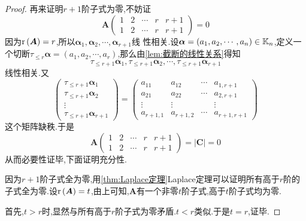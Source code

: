 {\begin{proof}
        再来证明$r+1$阶子式为零,不妨证
        \[
            \bm{A}\begin{pmatrix}
                1 & 2 & \cdots & r & r+1 \\
                1 & 2 & \cdots & r & r+1
            \end{pmatrix}=0
        \]
        因为$\mathrm{r} \left(\bm{A}\right)=r$,所以$\bm{\alpha}_1,\bm{\alpha}_{2},\cdots,\bm{\alpha}_{r+1}$线
        性相关.设$\bm{\alpha}=\left(a_1,a_2,\cdots,a_n\right)\in \mathbb{K} _n$,定义一个切断$\tau _{\leqslant r}\bm{\alpha}=\left(a_1,a_2,\cdots,
            a_r\right)$,那么由\cref{lem:截断的线性关系}得知
        \[
            \tau_{\leqslant r+1}\bm{\alpha}_1,\tau_{\leqslant r+1}\bm{\alpha}_2,
            \cdots,\tau_{\leqslant r+1}\bm{\alpha}_{r+1}
        \]
        线性相关.又
        \[
            \begin{pmatrix}
                \tau_{\leqslant r+1}\bm{\alpha}_1 \\
                \tau_{\leqslant r+1}\bm{\alpha}_2 \\
                \vdots                            \\
                \tau_{\leqslant r+1}\bm{\alpha}_{r+1}
            \end{pmatrix}=
            \begin{pmatrix}
                a_{11}    & a_{12}    & \cdots & a_{1,r+1}   \\
                a_{21}    & a_{22}    & \cdots & a_{2,r+1}   \\
                \vdots    & \vdots    &        & \vdots      \\
                a_{r+1,1} & a_{r+1,2} & \cdots & a_{r+1,r+1}
            \end{pmatrix}
        \]
        这个矩阵缺秩.于是
        \[
            \bm{A}\begin{pmatrix}
                1 & 2 & \cdots & r & r+1 \\
                1 & 2 & \cdots & r & r+1
            \end{pmatrix}=\left|\bm{C}\right|=0
        \]
        从而必要性证毕,下面证明充分性.

        因为$r+1$阶子式全为零,用\cref{thm:Laplace定理}Laplace定理可以证明所有高于$r$阶的子式全为零.设$\mathrm{r} \left(\bm{A}\right)=t$,由上可知,$\bm{A}$有一个非零$t$阶子式,高于$t$阶子式均为零.

        首先,$t>r$时,显然与所有高于$r$阶子式为零矛盾.$t<r$类似.于是$t=r$,证毕.
    \end{proof}
}
